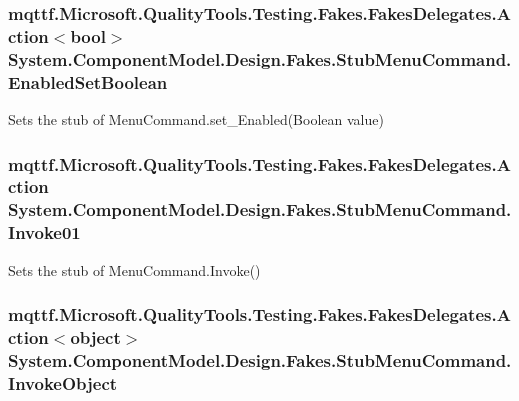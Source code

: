 \hypertarget{class_system_1_1_component_model_1_1_design_1_1_fakes_1_1_stub_menu_command_af56b28cb2a72c7202bc35933838a2c5a}{
\subsubsection[{Enabled\-Set\-Boolean}]{\setlength{\rightskip}{0pt plus 5cm}mqttf.\-Microsoft.\-Quality\-Tools.\-Testing.\-Fakes.\-Fakes\-Delegates.\-Action$<$bool$>$ System.\-Component\-Model.\-Design.\-Fakes.\-Stub\-Menu\-Command.\-Enabled\-Set\-Boolean}}\label{class_system_1_1_component_model_1_1_design_1_1_fakes_1_1_stub_menu_command_af56b28cb2a72c7202bc35933838a2c5a}


Sets the stub of Menu\-Command.\-set\-\_\-\-Enabled(\-Boolean value)

\hypertarget{class_system_1_1_component_model_1_1_design_1_1_fakes_1_1_stub_menu_command_a7bb5069b2ce8ebdc191c7368550d33e0}{
\subsubsection[{Invoke01}]{\setlength{\rightskip}{0pt plus 5cm}mqttf.\-Microsoft.\-Quality\-Tools.\-Testing.\-Fakes.\-Fakes\-Delegates.\-Action System.\-Component\-Model.\-Design.\-Fakes.\-Stub\-Menu\-Command.\-Invoke01}}\label{class_system_1_1_component_model_1_1_design_1_1_fakes_1_1_stub_menu_command_a7bb5069b2ce8ebdc191c7368550d33e0}


Sets the stub of Menu\-Command.\-Invoke()

\hypertarget{class_system_1_1_component_model_1_1_design_1_1_fakes_1_1_stub_menu_command_a4b34f89591f5eadc9d68836b77a50fbc}{
\subsubsection[{Invoke\-Object}]{\setlength{\rightskip}{0pt plus 5cm}mqttf.\-Microsoft.\-Quality\-Tools.\-Testing.\-Fakes.\-Fakes\-Delegates.\-Action$<$object$>$ System.\-Component\-Model.\-Design.\-Fakes.\-Stub\-Menu\-Command.\-Invoke\-Object}}\label{class_system_1_1_component_model_1_1_design_1_1_fakes_1_1_stub_menu_command_a4b34f89591f5eadc9d68836b77a50fbc}



